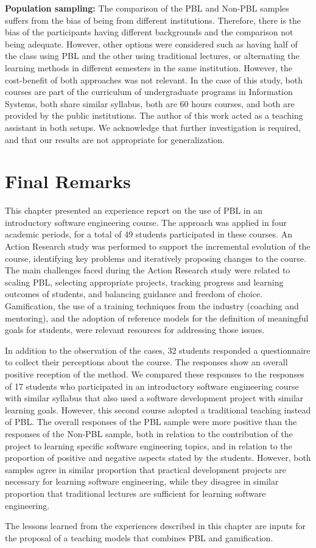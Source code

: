 \textbf{Population sampling:} The comparison of the PBL and Non-PBL samples suffers from the bias of being from different institutions. Therefore, there is the bias of the participants having different backgrounds and the comparison not being adequate. However, other options were considered such as having half of the class using PBL and the other using traditional lectures, or alternating the learning methods in different semesters in the same institution. However, the cost-benefit of both approaches was not relevant. In the case of this study, both courses are part of the curriculum of undergraduate programs in Information Systems, both share similar syllabus, both are 60 hours courses, and both are provided by the public institutions. The author of this work acted as a teaching assistant in both setups. We acknowledge that further investigation is required, and that our results are not appropriate for generalization.

\section{Final Remarks}

This chapter presented an experience report on the use of PBL in an introductory software engineering course. The approach was applied in four academic periods, for a total of 49 students participated in these courses. An Action Research study was performed to support the incremental evolution of the course, identifying key problems and iteratively proposing changes to the course. The main challenges faced during the Action Research study were related to scaling PBL, selecting appropriate projects, tracking progress and learning outcomes of students, and balancing guidance and freedom of choice. Gamification, the use of a training techniques from the industry (coaching and mentoring), and the adoption of reference models for the definition of meaningful goals for students, were relevant resources for addressing those issues.   

In addition to the observation of the cases, 32 students responded a questionnaire to collect their perceptions about the course. The responses show an overall positive reception of the method. We compared these responses to the responses of 17 students who participated in an introductory software engineering course with similar syllabus that also used a software development project with similar learning goals. However, this second course adopted a traditional teaching instead of PBL. The overall responses of the PBL sample were more positive than the responses of the Non-PBL sample, both in relation to the contribution of the project to learning specific software engineering topics, and in relation to the proportion of positive and negative aspects stated by the students. However, both samples agree in similar proportion that practical development projects are necessary for learning software engineering, while they disagree in similar proportion that traditional lectures are sufficient for learning software engineering.

The lessons learned from the experiences described in this chapter are inputs for the proposal of a teaching models that combines PBL and gamification.
